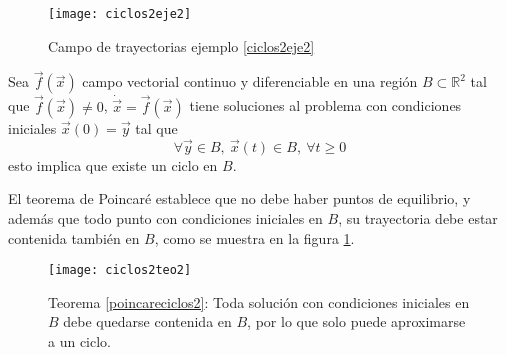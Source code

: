 \begin{figure}[htpb]
  \centering
  \texttt{[image: ciclos2eje2]}
  \caption{Campo de trayectorias ejemplo \ref{ciclos2eje2}}
\end{figure}

\begin{tcolorbox}[colback=Black!4,colframe=White, arc = 2mm]
  \begin{teorema} \label{poincareciclos2}
  Sea $\vec{f}(\vec{x})$ campo vectorial continuo y diferenciable en una región $B \subset \mathbb{R}^2$ tal que $\vec{f}(\vec{x})\neq 0$, $\dot{\vec{x}}=\vec{f}(\vec{x})$ tiene soluciones al problema con condiciones iniciales $\vec{x}(0)=\vec{y}$ tal que $$\forall \vec{y}\in B ,\ \vec{x}(t)\in B ,\ \forall t \ge 0$$ esto implica que existe un ciclo en $B$. 
\end{teorema}
\end{tcolorbox}

\begin{tcolorbox}[colback=Black!4, colframe=White, arc=2mm]
\begin{nota}
  El teorema de Poincaré establece que no debe haber puntos de equilibrio, y además que todo punto con condiciones iniciales en $B$, su trayectoria debe estar contenida también en  $B$, como se muestra en la figura \ref{ciclos2teo2}.
  
\end{nota}
\end{tcolorbox}

\begin{figure}[htpb]
  \centering
  \texttt{[image: ciclos2teo2]}
  \caption{Teorema \ref{poincareciclos2}: Toda solución con condiciones iniciales en $B$ debe quedarse contenida en $B$, por lo que solo puede aproximarse a un ciclo.}
  \label{ciclos2teo2}
\end{figure}


